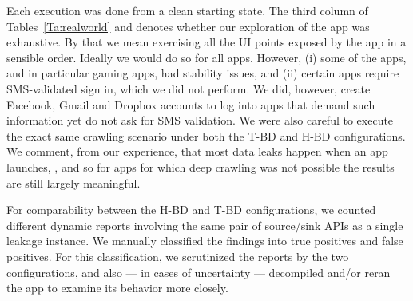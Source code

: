  Each execution was done from a clean starting state.
The third column of  Tables~\ref{Ta:realworld} and \JC{\ref{Ta:realworldAll}} denotes whether our exploration of the app was exhaustive. By that we mean exercising all the UI points exposed by the app in a sensible order. Ideally we would do so for all apps. However, (i) some of the apps, and in particular gaming apps, had stability issues, and (ii) certain apps require SMS-validated sign in, which we did not perform. We did, however, create Facebook, Gmail and Dropbox accounts to log into apps that demand such information yet do not ask for SMS validation. We were also careful to execute the exact same crawling scenario under both the T-BD and H-BD configurations. We comment, from our experience, that most data leaks happen when an app launches, , and so for apps for which deep crawling was not possible the results are still largely meaningful.

For comparability between the H-BD and T-BD configurations, we counted different dynamic reports involving the same pair of source/sink APIs as a single leakage instance.
We manually classified the findings into true positives and false positives. For this classification, we scrutinized the reports by the two configurations, and also --- in cases of uncertainty --- decompiled and/or reran the app to examine its behavior more closely. 


